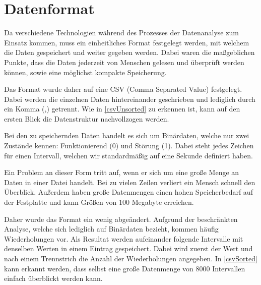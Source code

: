 \section{Datenformat} \label{ch:format}

Da verschiedene Technologien während des Prozesses der Datenanalyse zum Einsatz kommen, muss ein einheitliches Format festgelegt werden, mit welchem die Daten gespeichert und weiter gegeben werden. Dabei waren die maßgeblichen Punkte, dass die Daten jederzeit von Menschen gelesen und überprüft werden können, sowie eine möglichst kompakte Speicherung. 

Das Format wurde daher auf eine CSV (Comma Separated Value) festgelegt. Dabei werden die einzelnen Daten hintereinander geschrieben und lediglich durch ein Komma (,) getrennt. Wie in \autoref{csvUnsorted} zu erkennen ist, kann auf den ersten Blick die Datenstruktur nachvollzogen werden. 

Bei den zu speichernden Daten handelt es sich um Binärdaten, welche nur zwei Zustände kennen: Funktionierend (0) und Störung (1). Dabei steht jedes Zeichen für einen Intervall, welchen wir standardmäßig auf eine Sekunde definiert haben.




\vspace{30pt}
Ein Problem an dieser Form tritt auf, wenn er sich um eine große Menge an Daten in einer Datei handelt. Bei zu vielen Zeilen verliert ein Mensch schnell den Überblick. Außerdem haben große Datenmengen einen hohen Speicherbedarf auf der Festplatte und kann Größen von 100 Megabyte erreichen.

Daher wurde das Format ein wenig abgeändert. Aufgrund der beschränkten Analyse, welche sich lediglich auf Binärdaten bezieht, kommen häufig Wiederholungen vor. Als Resultat werden aufeinander folgende Intervalle mit denselben Werten in einem Eintrag gespeichert. Dabei wird zuerst der Wert und nach einem Trennstrich die Anzahl der Wiederholungen angegeben. In \autoref{csvSorted} kann erkannt werden, dass selbst eine große Datenmenge von 8000 Intervallen einfach überblickt werden kann.





